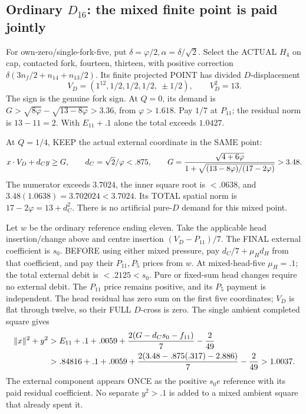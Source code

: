 \documentclass[11pt]{article}
\begin{document}
\subsection{Ordinary \(D_{16}\): the mixed finite point is paid jointly}
\label{app:arithD16ordinarymixed}

For own-zero/single-fork-five, put
\(\delta=\varphi/2,\alpha=\delta/\sqrt2\).
Select the ACTUAL \(H_4\) on cap,
contacted fork, fourteen, thirteen, with
positive correction
\(\delta(3n_f/2+n_{14}+n_{13}/2)\).
Its finite projected POINT has divided
\(D\)-displacement
\[
                 V_D=(1^{12},1/2,1/2,1/2,\ \pm1/2),\qquad V_D^2=13 .
\]
The sign is the genuine fork sign.
At \(Q=0\), its demand is
\(G>\sqrt{8\varphi}-\sqrt{13-8\varphi}>3.36\),
from \(\varphi>1.618\).
Pay \(1/7\) at \(P_{11}\);
the residual norm is \(13-11=2\).
With \(E_{11}+.1\) alone the total
exceeds \(1.0427\).

At \(Q=1/4\), KEEP the actual external
coordinate in the SAME point:
\[
 x\cdot V_D+d_Cy\ge G,\qquad
 d_C=\sqrt2/\varphi<.875,\qquad
 G={\sqrt{4+6\varphi}\over
           1+\sqrt{(13-8\varphi)/(17-2\varphi)}}>3.48 .
\]
The numerator exceeds \(3.7024\), the
inner square root is \(<.0638\), and
\(3.48(1.0638)=3.702024<3.7024\).
Its TOTAL spatial norm is
\(17-2\varphi=13+d_C^2\).
There is no artificial pure-\(D\)
demand for this mixed point.

Let \(w\) be the ordinary reference
ending eleven.
Take the applicable head insertion/change
above and centre insertion
\((V_D-P_{11})/7\).
The FINAL external coefficient is \(s_0\).
BEFORE using either mixed pressure, pay
\(d_C/7+\mu_Hd_H\) from that coefficient,
and pay their \(P_{11},P_5\) prices
from \(w\).
At mixed-head-five \(\mu_H=.1\);
the total external debit is \(<.2125<s_0\).
Pure or fixed-sum head changes require
no external debit.
The \(P_{11}\) price remains positive,
and its \(P_5\) payment is independent.
The head residual has zero sum on
the first five coordinates; \(V_D\)
is flat through twelve, so their FULL
\(D\)-cross is zero.
The single ambient completed square gives
\[
 \begin{split}
 \|x\|^2+y^2
 &>E_{11}+.1+.0059+
           {2(G-d_Cs_0-f_{11})\over7}-{2\over49}\\
 &>.84816+.1+.0059+
           {2(3.48-.875(.317)-2.886)\over7}-{2\over49}>1.0037 .
 \end{split}
\]
The external component appears ONCE as
the positive \(s_0e\) reference with its
paid residual coefficient.
No separate \(y^2>.1\) is added to a
mixed ambient square that already spent it.
\end{document}
